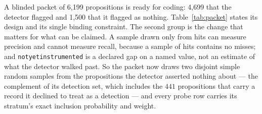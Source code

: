\documentclass[11pt]{article}
\DeclareRobustCommand{\_}{\textunderscore\allowbreak}
\begin{document}
A blinded packet of 6{,}199 propositions is ready for coding: 4{,}699 that the
detector flagged and 1{,}500 that it flagged as nothing. Table~\ref{tab:packet}
states its design and its single binding constraint. The second group is the
change that matters for what can be claimed. A sample drawn only from hits can
measure precision and cannot measure recall, because a sample of hits contains no
misses; and \texttt{not\_yet\_instrumented} is a declared gap on a named value, not
an estimate of what the detector walked past. So the packet now draws two disjoint
simple random samples from the propositions the detector asserted nothing about --- the
complement of its detection set, which includes the \(441\) propositions that carry a
record it declined to treat as a detection --- and
every probe row carries its stratum's exact inclusion probability and weight.
\end{document}

